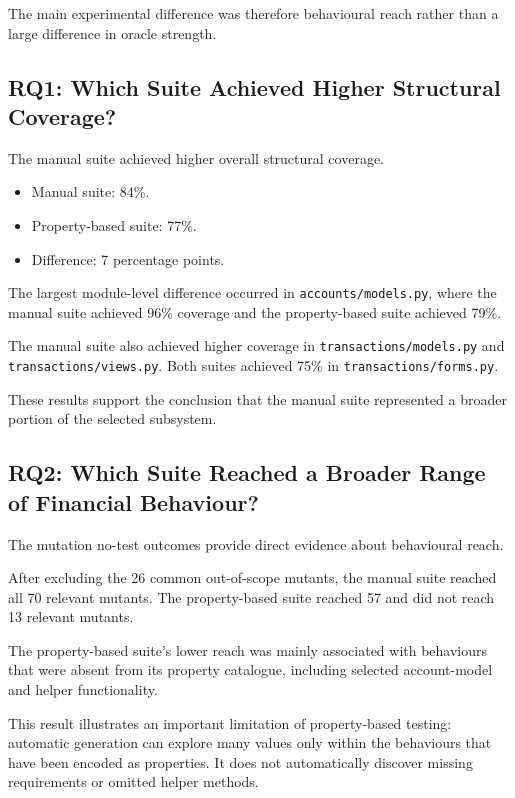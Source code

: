 \documentclass[12pt]{article}
\begin{document}
The main experimental difference was therefore behavioural reach rather than
a large difference in oracle strength.

\subsection{RQ1: Which Suite Achieved Higher Structural Coverage?}

The manual suite achieved higher overall structural coverage.

\begin{itemize}
    \item Manual suite: 84\%.
    \item Property-based suite: 77\%.
    \item Difference: 7 percentage points.
\end{itemize}

The largest module-level difference occurred in
\texttt{accounts/models.py}, where the manual suite achieved 96\% coverage and
the property-based suite achieved 79\%.

The manual suite also achieved higher coverage in
\texttt{transactions/models.py} and \texttt{transactions/views.py}. Both
suites achieved 75\% in \texttt{transactions/forms.py}.

These results support the conclusion that the manual suite represented a
broader portion of the selected subsystem.

\subsection{RQ2: Which Suite Reached a Broader Range of Financial Behaviour?}

The mutation no-test outcomes provide direct evidence about behavioural reach.

After excluding the 26 common out-of-scope mutants, the manual suite reached
all 70 relevant mutants. The property-based suite reached 57 and did not reach
13 relevant mutants.

The property-based suite's lower reach was mainly associated with behaviours
that were absent from its property catalogue, including selected account-model
and helper functionality.

This result illustrates an important limitation of property-based testing:
automatic generation can explore many values only within the behaviours that
have been encoded as properties. It does not automatically discover missing
requirements or omitted helper methods.
\end{document}
